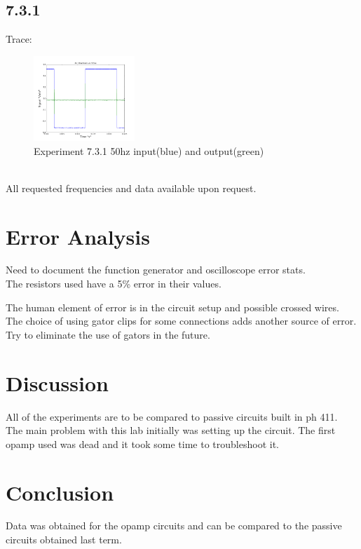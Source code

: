 \documentclass[a4paper,12pt]{article}
\begin{document}
\newpage
\subsection*{7.3.1}
Trace:
\begin{figure}[h]
\centering
\includegraphics[width=1.5in]{7.3.1/lab7_3_1_50hz_ch1_ch2.png}
\caption{Experiment 7.3.1 50hz input(blue) and output(green)}
\end{figure}\\
All requested frequencies and data available upon request.

\section*{Error Analysis}
Need to document the function generator and oscilloscope error stats.\\
The resistors used have a 5\% error in their values.

The human element of error is in the circuit setup and possible crossed wires.  The choice of using gator clips for some connections adds another source of error.  Try to eliminate the use of gators in the future.

\section*{Discussion}
All of the experiments are to be compared to passive circuits built in ph 411.\\
The main problem with this lab initially was setting up the circuit.  The first opamp used was dead and it took some time to troubleshoot it.


\section*{Conclusion}
Data was obtained for the opamp circuits and can be compared to the passive circuits obtained last term.
\end{document}
